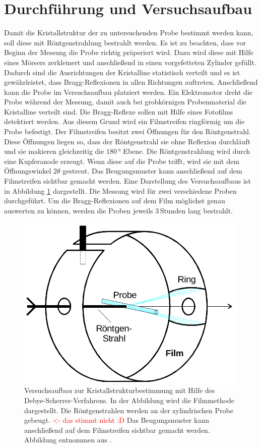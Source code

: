 \section{Durchführung und Versuchsaufbau}

Damit die Kristallstruktur der zu untersuchenden Probe bestimmt werden kann, soll diese mit Röntgenstrahlung bestrahlt werden.
Es ist zu beachten, dass vor Beginn der Messung die Probe richtig präperiert wird. Dazu wird diese mit Hilfe eines Mörsers zerkleinert und anschließend in einen vorgefetteten
Zylinder gefüllt.
Dadurch sind die Ausrichtungen der Kristalline statistisch verteilt und es ist gewährleistet, dass Bragg-Reflexionen in allen Richtungen auftreten.
Anschließend kann die Probe im Versuchsaufbau platziert werden. Ein Elektromotor dreht die Probe während der Messung, damit auch bei grobkörnigen Probenmaterial
die Kristalline verteilt sind.\newline
Die Bragg-Reflexe sollen mit Hilfe eines Fotofilms detektiert werden. Aus diesem Grund wird ein Filmstreifen ringförmig um die Probe befestigt. Der Filmstreifen besitzt zwei Öffnungen für den
Röntgenstrahl. Diese Öffnungen liegen so, dass der Röntgenstrahl sie ohne Reflexion durchläuft und sie makieren gleichzeitig die $180\,\text{°}$ Ebene.
Die Röntgenstrahlung wird durch eine Kupferanode erzeugt. Wenn diese auf die Probe trifft, wird sie mit dem Öffnungswinkel $2\theta$ gestreut. Das Beugungsmuster kann anschließend auf dem
Filmstreifen sichtbar gemacht werden.
Eine Darstellung des Versuchsaufbaus ist in Abbildung \ref{abb:aufbau} dargestellt.\newline
Die Messung wird für zwei verschiedene Proben durchgeführt. Um die Bragg-Reflexionen auf dem Film möglichst genau auswerten zu können, werden die Proben jeweils
$3\,\text{Stunden}$ lang bestrahlt.

\begin{figure}
  \centering
  \includegraphics[scale=0.35]{aufbau.png}
  \caption{Versuchsaufbau zur Kristallstrukturbestimmung mit Hilfe des Debye-Scherrer-Verfahrens. In der Abbildung wird die Filmmethode dargestellt. Die Röntgenstrahlen werden an der zylindrischen
  Probe gebeugt. \textcolor{red}{<- das stimmt nicht :D} Das Beugungsmuster kann anschließend auf dem Filmstreifen sichtbar gemacht werden. Abbildung entnommen aus \cite{V41}.}
  \label{abb:aufbau}
\end{figure}

